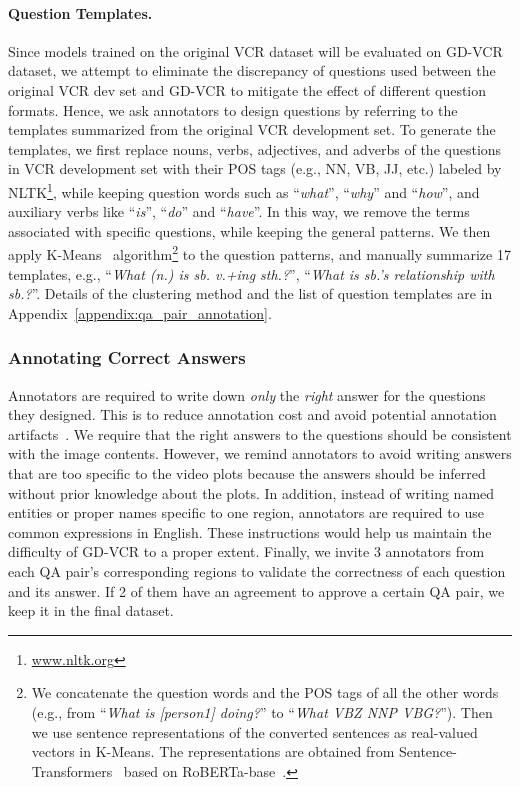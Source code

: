 \documentclass[11pt]{article}
\begin{document}
\paragraph{Question Templates.}
Since models trained on the original VCR dataset will be evaluated on GD-VCR dataset, we attempt to eliminate the discrepancy of questions used between the original VCR dev set and GD-VCR to mitigate the effect of different question formats. Hence, we ask annotators to design questions by referring to the templates summarized from the original VCR development set. To generate the templates, we first replace nouns, verbs, adjectives, and adverbs of the questions in VCR development set with their POS tags (e.g., NN, VB, JJ, etc.) labeled by NLTK\footnote{\url{www.nltk.org}}, while keeping question words such as ``\textit{what}'', ``\textit{why}'' and ``\textit{how}'', and auxiliary verbs like ``\textit{is}'', ``\textit{do}'' and ``\textit{have}''. In this way, we remove the terms associated with specific questions, while keeping the general patterns. We then apply K-Means~\citep{macqueen1967some} algorithm\footnote{We concatenate the question words and the POS tags of all the other words (e.g., from ``\textit{What is [person1] doing?}'' to ``\textit{What VBZ NNP VBG?}''). Then we use sentence representations of the converted sentences as real-valued vectors in K-Means. The representations are obtained from Sentence-Transformers~\cite{reimers-2019-sentence-bert} based on RoBERTa-base~\cite{DBLP:journals/corr/abs-1907-11692}.} to the question patterns, and manually summarize 17 templates, e.g., ``\textit{What (n.) is sb. v.+ing sth.?}'', ``\textit{What is sb.'s relationship with sb.?}''. Details of the clustering method and the list of question templates are in Appendix~\ref{appendix:qa_pair_annotation}. 

\subsubsection{Annotating Correct Answers}
Annotators are required to write down \emph{only} the \emph{right} answer for the questions they designed. This is to reduce annotation cost and avoid potential annotation artifacts~\cite{zellers2019vcr}. 
We require that the right answers to the questions should be consistent with the image contents. However, we remind annotators to avoid writing answers that are too specific to the video plots because the answers should be inferred without prior knowledge about the plots. In addition, instead of writing named entities or proper names specific to one region, annotators are required to use common expressions in English. 
These instructions would help us maintain the difficulty of GD-VCR to a proper extent. Finally, we invite 3 annotators from each QA pair's corresponding regions to validate the correctness of each question and its answer. If 2 of them have an agreement to approve a certain QA pair, we keep it in the final dataset. 
\end{document}
